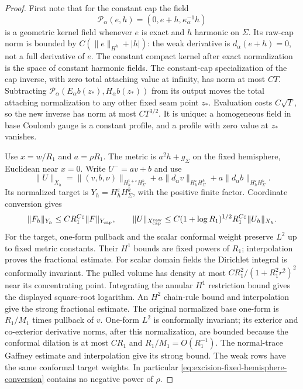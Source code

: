 \documentclass[11pt]{amsart}
\theoremstyle{definition}
\theoremstyle{remark}
\theoremstyle{plain}
\begin{document}
\begin{proof}
First note that for the constant cap the field
\[
 \mathcal P_\alpha(e,h)
       =(0,e+h,\kappa_\alpha^{-1}h)
\]
is a geometric kernel field whenever $e$ is exact and
$h$ harmonic on $\Sigma$. Its raw-cap norm is bounded
by $C(\|e\|_{H^k}+|h|)$: the weak derivative is
$d_\alpha(e+h)=0$, not a full derivative of $e$.
The constant compact kernel after exact normalization
is the space of constant harmonic fields.
The constant-cap specialization of the cap inverse,
with zero total attaching value at infinity, has norm
at most $CT$. Subtracting
$\mathcal P_\alpha(E_\alpha b(z_*),H_\alpha b(z_*))$
from its output moves the total attaching normalization
to any other fixed seam point $z_*$.
Evaluation costs $C\sqrt T$, so the new inverse has
norm at most $CT^{3/2}$. It is unique: a homogeneous
field in base Coulomb gauge is a constant profile,
and a profile with zero value at $z_*$ vanishes.

Use $x=w/R_1$ and $a=\rho R_1$.
The metric is $a^2h+g_\Sigma$ on the fixed hemisphere,
Euclidean near $x=0$. Write $U^-=av+b$ and use
\[
 \|U\|_{X_h}=
 \|(v,b,\nu)\|_{H_h^{1+\varepsilon}H^k_\Sigma}
 +a\|d_\alpha v\|_{H_h^\varepsilon H^k_\Sigma}
 +a\|d_\alpha b\|_{H_h^\varepsilon H^k_\Sigma}.
\]
Its normalized target is $Y_h=H_h^\varepsilon H^k_\Sigma$,
with the positive finite factor. Coordinate conversion gives
\begin{equation}\label{eq:excision-fixed-hemisphere-conversion}
 \|F_h\|_{Y_h}\leq CR_1^{C\varepsilon}\|F\|_{Y_{\rm cap}},
 \qquad
 \|U\|_{X_{\rm cap}^{\rm raw}}
 \leq C(1+\log R_1)^{1/2}R_1^{C\varepsilon}\|U_h\|_{X_h}.
\end{equation}
For the target, one-form pullback and the scalar conformal
weight preserve $L^2$ up to fixed metric constants.
Their $H^1$ bounds are fixed powers of $R_1$;
interpolation proves the fractional estimate.
For scalar domain fields the Dirichlet integral is
conformally invariant. The pulled volume has density
at most $CR_1^2/(1+R_1^2r^2)^2$ near its concentrating
point. Integrating the annular $H^1$ restriction
bound gives the displayed square-root logarithm.
An $H^2$ chain-rule bound and interpolation give
the strong fractional estimate.
The original normalized base one-form is $R_1/M_1$
times pullback of $v$. One-form $L^2$ is conformally
invariant; its exterior and co-exterior derivative
norms, after this normalization, are bounded because
the conformal dilation is at most $CR_1$ and
$R_1/M_1=O(R_1^{-1})$.
The normal-trace Gaffney estimate and interpolation
give its strong bound. The weak rows have the
same conformal target weights. In particular
\eqref{eq:excision-fixed-hemisphere-conversion}
contains no negative power of $\rho$.


\end{proof}
\end{document}
